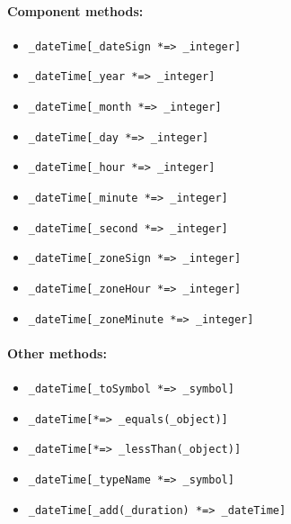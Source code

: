 \documentclass[11pt]{article}
\begin{document}
\paragraph{Component methods:}
\begin{itemize}
      \item {\tt \_dateTime[\_dateSign *=> \_integer]}  
      \item {\tt \_dateTime[\_year *=> \_integer]}  
      \item {\tt \_dateTime[\_month *=> \_integer]}  
      \item {\tt \_dateTime[\_day *=> \_integer]}  
      \item {\tt \_dateTime[\_hour *=> \_integer]}  
      \item {\tt \_dateTime[\_minute *=> \_integer]}  
      \item {\tt \_dateTime[\_second *=> \_integer]}  
      \item {\tt \_dateTime[\_zoneSign *=> \_integer]}  
      \item {\tt \_dateTime[\_zoneHour *=> \_integer]}  
      \item {\tt \_dateTime[\_zoneMinute *=> \_integer]}  
    \end{itemize}

\paragraph{Other methods:}
\begin{itemize}
      \item {\tt \_dateTime[\_toSymbol *=> \_symbol]}  
      \item {\tt \_dateTime[*=> \_equals(\_object)]}  
      \item {\tt \_dateTime[*=> \_lessThan(\_object)]}  
      \item {\tt \_dateTime[\_typeName *=> \_symbol]}  
      \item {\tt \_dateTime[\_add(\_duration) *=> \_dateTime]}  
    \end{itemize}
\end{document}
